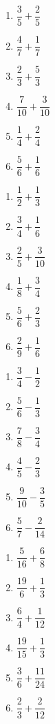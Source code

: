 \documentclass[11pt]{article}
\begin{document}
\begin{exercice}[0]
\begin{multicols}{3}
\begin{enumerate}
\item $\dfrac{3}{5} + \dfrac{2}{5}$
\item $\dfrac{4}{7} + \dfrac{1}{7}$
\item $\dfrac{2}{3} + \dfrac{5}{3}$
\item $\dfrac{7}{10} + \dfrac{3}{10}$
\item $\dfrac{1}{4} + \dfrac{2}{4}$
\item $\dfrac{5}{6} + \dfrac{1}{6}$
\end{enumerate}
\end{multicols}
\end{exercice}

\begin{exercice}[0]
\begin{multicols}{3}
\begin{enumerate}
\item $\dfrac{1}{2} + \dfrac{1}{3}$
\item $\dfrac{3}{4} + \dfrac{1}{6}$
\item $\dfrac{2}{5} + \dfrac{3}{10}$
\item $\dfrac{1}{8} + \dfrac{3}{4}$
\item $\dfrac{5}{6} + \dfrac{2}{3}$
\item $\dfrac{2}{9} + \dfrac{1}{6}$
\end{enumerate}
\end{multicols}
\end{exercice}

\begin{exercice}[0]
\begin{multicols}{3}
\begin{enumerate}
\item $\dfrac{3}{4} - \dfrac{1}{2}$
\item $\dfrac{5}{6} - \dfrac{1}{3}$
\item $\dfrac{7}{8} - \dfrac{3}{4}$
\item $\dfrac{4}{5} - \dfrac{2}{3}$
\item $\dfrac{9}{10} - \dfrac{3}{5}$
\item $\dfrac{5}{7} - \dfrac{2}{14}$
\end{enumerate}
\end{multicols}
\end{exercice}


\begin{exercice}[0]
\begin{multicols}{3}
\begin{enumerate}
\item $\dfrac{5}{16}+\dfrac{6}{8}$
\item $\dfrac{19}{6}+\dfrac{1}{3}$
\item $\dfrac{6}{4}+\dfrac{1}{12}$
\item $\dfrac{19}{15}+\dfrac{1}{3}$
\item $\dfrac{3}{6}+\dfrac{11}{24}$
\item $\dfrac{2}{3}+\dfrac{2}{12}$
\end{enumerate}
\end{multicols}
\end{exercice}
\end{document}
